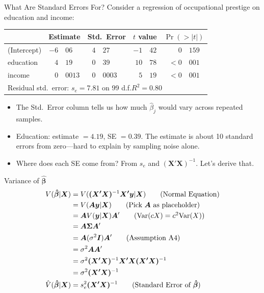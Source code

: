 \documentclass[aspectratio=169, handout]{beamer}
\numberwithin{equation}{section}
\begin{document}
\begin{frame}[fragile]{What Are Standard Errors For?}
\small
Consider a regression of occupational prestige on education and income:
\vspace{0.3em}
\begin{center}
\begin{tabular}{l r@{.}l r@{.}l r@{.}l r@{.}l}
\hline
& \multicolumn{2}{c}{Estimate} & \multicolumn{2}{c}{\alert{Std.\ Error}} & \multicolumn{2}{c}{$t$ value} & \multicolumn{2}{c}{$\Pr(>|t|)$}\\
\hline
(Intercept) & $-6$&$06$ & $4$&$27$ & $-1$&$42$ & $0$&$159$\\
education & $4$&$19$ & $0$&$39$ & \phantom{$-$}$10$&$78$ & $<0$&$001$\\
income & $0$&$0013$ & $0$&$0003$ & \phantom{$-$}$5$&$19$ & $<0$&$001$\\
\hline
\multicolumn{9}{l}{\scriptsize Residual std.\ error: $s_e = 7.81$ on 99 d.f.\quad $R^2 = 0.80$}
\end{tabular}
\end{center}
\vspace{0.3em}
\begin{itemize}
\item The \alert{Std.\ Error} column tells us how much $\hat{\beta}_j$ would vary across repeated samples.\pause
\item Education: estimate $= 4.19$, SE $= 0.39$. The estimate is about 10 standard errors from zero---hard to explain by sampling noise alone.\pause
\item Where does each SE come from? From $s_e$ and $(\bm{X'X})^{-1}$. Let's derive that.
\end{itemize}
\end{frame}

\begin{frame}{Variance of $\bm{\hat{\beta}}$}
\begin{align*}
V(\bm{\hat{\beta}}|\bm{X})&=V(\bm{(X'X)}^{-1}\bm{X'y}|\bm{X}) \tag{Normal Equation}\\
&=V(\bm{A}\bm{y}|\bm{X})  \tag{Pick $\bm{A}$ as placeholder}\\
&=\bm{A}V(\bm{y}|\bm{X})\bm{A}' \tag{$\text{Var}(cX)=c^2\text{Var}(X)$}\\
&=\bm{A}\bm{\Sigma}\bm{A}'\\
&=\bm{A}(\sigma^2\bm{I})\bm{A}' \tag{Assumption A4}\\
&=\sigma^2\bm{A}\bm{A}'\\
&=\sigma^2\bm{(X'X)}^{-1}\bm{X'X}\bm{(X'X)}^{-1}\\
&=\sigma^2\bm{(X'X)}^{-1}\\
\hat{V}(\bm{\hat{\beta}}|\bm{X})&=s_e^2\bm{(X'X)}^{-1} \tag{Standard Error of $\bm{\hat{\beta}}$}
\end{align*}
\end{frame}
\end{document}
